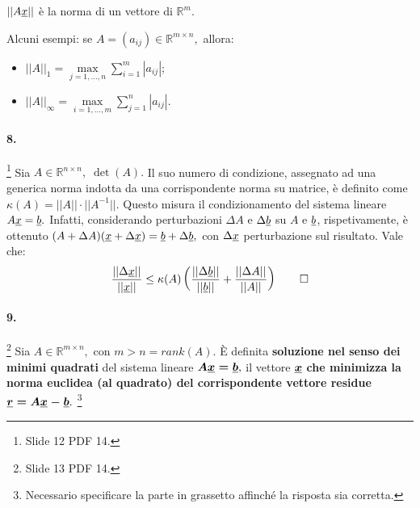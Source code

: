\begin{remark}
    $||A\uline x||$ è la norma di un vettore di $\mathbb R^m.$
\end{remark}

\noindent Alcuni esempi: se $A=(a_{ij})\in\mathbb R^{m\times n},$ allora:
\begin{itemize}
    \item $||A||_1=\underset{j=1,\hdots,n}{\max}\sum_{i=1}^m|a_{ij}|;$
    \item $||A||_\infty=\underset{i=1,\hdots,m}{\max}\sum_{j=1}^n|a_{ij}|.$
\end{itemize}

\paragraph{8.}\footnote{Slide 12 PDF 14.} Sia $A\in\mathbb R^{n\times n},\;\det(A).$ Il suo numero di condizione, assegnato ad una generica norma indotta da una corrispondente norma su matrice, è definito come $\kappa(A)=||A||\cdot||A^{-1}||.$ Questo misura il condizionamento del sistema lineare $A\uline x= \uline b.$ Infatti, considerando perturbazioni $\Delta A$ e $\Delta\uline b$ su $A$ e $\uline b$, rispetivamente, è ottenuto $(A+\Delta A)(\uline x+\Delta\uline x)= \uline b+\Delta\uline b,$ con $\Delta\uline x$ perturbazione sul risultato. Vale che:
\begin{equation*}
    \frac{||\Delta\uline x||}{||\uline x||}\leq\kappa(A)\left(\frac{||\Delta\uline b||}{||\uline b||}+\frac{||\Delta A||}{||A||}\right)\qed
\end{equation*}

\paragraph{9.}\footnote{Slide 13 PDF 14.} Sia $A\in\mathbb R^{m\times n},$ con $m>n=rank(A).$ È definita \textbf{soluzione nel senso dei minimi quadrati} del sistema lineare $\boldsymbol{A\uline x=\uline b},$ il vettore $\boldsymbol{\uline x}$ \textbf{che minimizza la norma euclidea (al quadrato) del corrispondente vettore residue} $\boldsymbol{\uline r=A\uline x-\uline b}.$ \footnote{Necessario specificare la parte in grassetto affinché la risposta sia corretta.}

